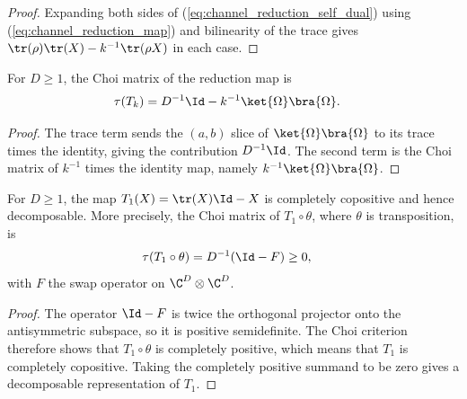 \begin{proof}\leanok
    Expanding both sides of (\ref{eq:channel_reduction_self_dual}) using
    (\ref{eq:channel_reduction_map}) and bilinearity of the trace gives
    $\tr(\rho)\tr(X)-k^{-1}\tr(\rho X)$ in each case.
\end{proof}

\begin{theorem}
    \label{thm:choi_matrix_reduction_map}
    \leanok
    For $D\ge 1$, the Choi matrix of the reduction map is
    \begin{align}
        \tau(T_k)
         & =D^{-1}\Id-k^{-1}\ket{\Omega}\bra{\Omega}.
        \label{eq:channel_reduction_choi}
    \end{align}
\end{theorem}

\begin{proof}\leanok
    The trace term sends the $(a,b)$ slice of
    $\ket{\Omega}\bra{\Omega}$ to its trace times the identity, giving
    the contribution $D^{-1}\Id$. The second term is the Choi matrix of
    $k^{-1}$ times the identity map, namely
    $k^{-1}\ket{\Omega}\bra{\Omega}$.
\end{proof}

\begin{theorem}
    \label{thm:reduction_map_one_completely_copositive}
    \leanok
    For $D\ge1$, the map $T_1(X)=\tr(X)\Id-X$ is completely copositive and
    hence decomposable. More precisely, the Choi matrix of
    $T_1\circ\theta$, where $\theta$ is transposition, is
    \begin{align}
        \tau(T_1\circ\theta) & =D^{-1}(\Id-F)\ge0,
        \notag
    \end{align}
    with $F$ the swap operator on $\C^D\otimes\C^D$.
\end{theorem}

\begin{proof}\leanok
    The operator $\Id-F$ is twice the orthogonal projector onto the
    antisymmetric subspace, so it is positive semidefinite. The Choi criterion
    therefore shows that $T_1\circ\theta$ is completely positive, which means
    that $T_1$ is completely copositive. Taking the completely positive
    summand to be zero gives a decomposable representation of $T_1$.
\end{proof}

